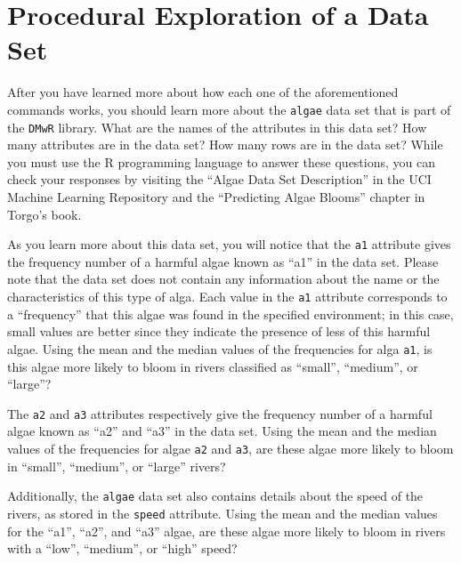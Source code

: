 
\section*{Procedural Exploration of a Data Set}

After you have learned more about how each one of the aforementioned commands works, you should learn more about the
{\tt algae} data set that is part of the {\tt DMwR} library. What are the names of the attributes in this data set? How
many attributes are in the data set? How many rows are in the data set? While you must use the R programming language to
answer these questions, you can check your responses by visiting the ``Algae Data Set Description'' in the UCI Machine
Learning Repository and the ``Predicting Algae Blooms'' chapter in Torgo's book. 

As you learn more about this data set, you will notice that the {\tt a1} attribute gives the frequency number of a
harmful algae known as ``a1'' in the data set. Please note that the data set does not contain any information about the
name or the characteristics of this type of alga. Each value in the {\tt a1} attribute corresponds to a ``frequency''
that this algae was found in the specified environment; in this case, small values are better since they indicate the
presence of less of this harmful algae. Using the mean and the median values of the frequencies for alga {\tt a1}, is
this algae more likely to bloom in rivers classified as ``small'', ``medium'', or ``large''?

The {\tt a2} and {\tt a3} attributes respectively give the frequency number of a harmful algae known as ``a2'' and
``a3'' in the data set. Using the mean and the median values of the frequencies for algae {\tt a2} and {\tt a3}, are
these algae more likely to bloom in ``small'', ``medium'', or ``large'' rivers?

Additionally, the {\tt algae} data set also contains details about the speed of the rivers, as stored in the {\tt speed}
attribute. Using the mean and the median values for the ``a1'', ``a2'', and ``a3'' algae, are these algae more
likely to bloom in rivers with a ``low'', ``medium'', or ``high'' speed?

